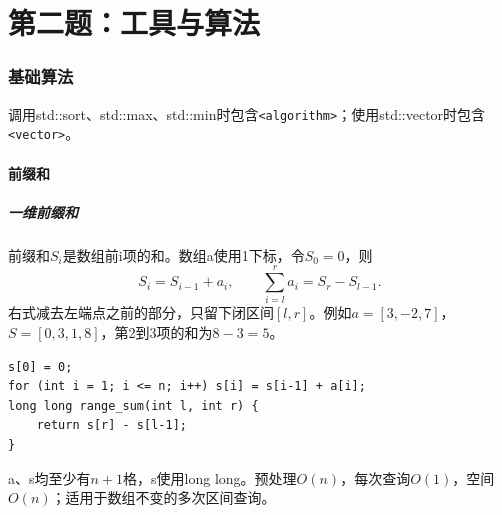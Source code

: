 \documentclass[UTF8,11pt,a4paper,fontset=none]{ctexart}
\begin{document}
\clearpage
\part{第二题：工具与算法}
\section{基础算法}
调用std::sort、std::max、std::min时包含\texttt{<algorithm>}；使用std::vector时包含\texttt{<vector>}。

\subsection{前缀和}
\subsubsection{一维前缀和}
前缀和$S_i$是数组前i项的和。数组a使用1下标，令$S_0=0$，则
\[
S_i=S_{i-1}+a_i,\qquad \sum_{i=l}^{r}a_i=S_r-S_{l-1}.
\]
右式减去左端点之前的部分，只留下闭区间$[l,r]$。例如$a=[3,-2,7]$，$S=[0,3,1,8]$，第2到3项的和为$8-3=5$。
\par\noindent\begin{minipage}{\linewidth}
\begin{lstlisting}
s[0] = 0;
for (int i = 1; i <= n; i++) s[i] = s[i-1] + a[i];
long long range_sum(int l, int r) {
    return s[r] - s[l-1];
}
\end{lstlisting}
\end{minipage}\par
a、s均至少有$n+1$格，s使用long long。预处理$O(n)$，每次查询$O(1)$，空间$O(n)$；适用于数组不变的多次区间查询。
\end{document}
